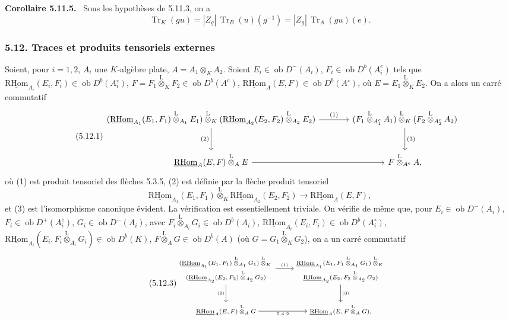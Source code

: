 \documentclass[11pt]{article}
\newenvironment{statement}[1]{\par\medskip\noindent\textbf{#1.}\ }{\par\medskip}
\newcommand{\ob}{\operatorname{ob}}
\providecommand{\RHom}{\mathrm{RHom}}
\providecommand{\uRHom}{\underline{\RHom}}
\providecommand{\Tr}{\operatorname{Tr}}
\providecommand{\Tr}{\operatorname{Tr}}
\providecommand{\lten}{\overset{\mathrm L}{\otimes}}
\providecommand{\Tr}{\operatorname{Tr}}
\providecommand{\RHom}{\mathrm{RHom}}
\providecommand{\ob}{\operatorname{ob}}
\providecommand{\lten}{\overset{\mathrm L}{\otimes}}
\providecommand{\RHom}{\mathrm R\mathcal{H}om}
\providecommand{\lten}{\overset{\mathrm L}{\otimes}}
\providecommand{\Tr}{\operatorname{Tr}}
\providecommand{\lten}{\overset{\mathrm L}{\otimes}}
\providecommand{\lten}{\overset{\mathrm L}{\otimes}}
\providecommand{\lten}{\overset{\mathrm L}{\otimes}}
\providecommand{\RHom}{\mathrm{RHom}}
\providecommand{\Tr}{\operatorname{Tr}}
\providecommand{\lten}{\overset{\mathrm L}{\otimes}}
\begin{document}
\begin{statement}{Corollaire 5.11.5}
Sous les hypothèses de 5.11.3, on a
\begin{equation}\tag{5.11.5}
\Tr_K(gu)=|Z_g|\,\Tr_B(u)(g^{-1})=|Z_g|\,\Tr_A(gu)(e).
\end{equation}
\end{statement}

\subsubsection*{5.12. Traces et produits tensoriels externes}

Soient, pour $i=1,2$, $A_i$ une $K$-algèbre plate, $A=A_1\otimes_KA_2$. Soient $E_i\in\ob D^-(A_i)$, $F_i\in\ob D^b(A_i^e)$ tels que $\uRHom_{A_i}(E_i,F_i)\in\ob D^b(A_i^\circ)$, $F=F_1\lten_KF_2\in\ob D^b(A^e)$, $\uRHom_A(E,F)\in\ob D^b(A^\circ)$, où $E=E_1\lten_KE_2$. On a alors un carré commutatif
\begin{equation}\tag{5.12.1}
\begin{tikzcd}[column sep=large,row sep=large]
(\uRHom_{A_1}(E_1,F_1)\lten_{A_1}E_1)\lten_K(\uRHom_{A_2}(E_2,F_2)\lten_{A_2}E_2) \arrow[r,"(1)"] \arrow[d,"(2)"'] & (F_1\lten_{A_1^e}A_1)\lten_K(F_2\lten_{A_2^e}A_2) \arrow[d,"(3)"]\\
\uRHom_A(E,F)\lten_AE \arrow[r] & F\lten_{A^e}A,
\end{tikzcd}
\end{equation}
où (1) est produit tensoriel des flèches 5.3.5, (2) est définie par la flèche produit tensoriel
\begin{equation}\tag{5.12.2}
\uRHom_{A_1}(E_1,F_1)\lten_K\uRHom_{A_2}(E_2,F_2)\longrightarrow\uRHom_A(E,F),
\end{equation}
et (3) est l'isomorphisme canonique évident. La vérification est essentiellement triviale. On vérifie de même que, pour $E_i\in\ob D^-(A_i)$, $F_i\in\ob D^+(A_i^e)$, $G_i\in\ob D^-(A_i)$, avec $F_i\lten_{A_i}G_i\in\ob D^b(A_i)$, $\uRHom_{A_i}(E_i,F_i)\in\ob D^b(A_i^\circ)$, $\uRHom_{A_i}(E_i,F_i\lten_{A_i}G_i)\in\ob D^b(K)$, $F\lten_AG\in\ob D^b(A)$ (où $G=G_1\lten_KG_2$), on a un carré commutatif
\begin{equation}\tag{5.12.3}
{\scriptsize
\begin{tikzcd}[column sep=2.8em,row sep=large]
\begin{gathered}
(\uRHom_{A_1}(E_1,F_1)\lten_{A_1}G_1)\lten_K{}\\[-.15em]
(\uRHom_{A_2}(E_2,F_2)\lten_{A_2}G_2)
\end{gathered}
\arrow[r,"(1)"] \arrow[d,"(2)"']
&
\begin{gathered}
\uRHom_{A_1}(E_1,F_1\lten_{A_1}G_1)\lten_K{}\\[-.15em]
\uRHom_{A_2}(E_2,F_2\lten_{A_2}G_2)
\end{gathered}
\arrow[d,"(3)"]\\
\uRHom_A(E,F)\lten_AG \arrow[r,"5.4.2"'] & \uRHom_A(E,F\lten_AG),
\end{tikzcd}
}
\end{equation}
\end{document}
